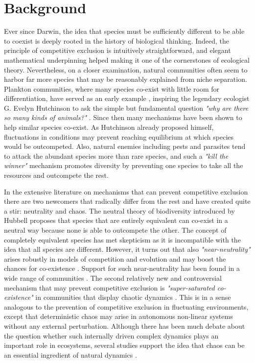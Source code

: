 \section{Background}
\label{sec:Background} 
Ever since Darwin, the idea that species must be sufficiently different to be able to coexist is deeply rooted in the history of biological thinking. Indeed, the principle of competitive exclusion is intuitively straightforward, and elegant mathematical underpinning\cite{MacArthur} helped making it one of the cornerstones of ecological theory. Nevertheless, on a closer examination, natural communities often seem to harbor far more species that may be reasonably explained from niche separation. Plankton communities, where many species co-exist with little room for differentiation, have served as an early example \cite{Hutchinson, Hutchinson1961}, inspiring the legendary ecologist G. Evelyn Hutchinson to ask the simple but fundamental question \textit{"why are there so many kinds of animals?"} \cite{Hutchinson1961}. Since then many mechanisms have been shown to help similar species co-exist. As Hutchinson already proposed himself, fluctuations in conditions may prevent reaching equilibrium at which species would be outcompeted. Also, natural enemies including pests and parasites tend to attack the abundant species more than rare species, and such a \textit{"kill the winner"}\cite{Winter2010} mechanism promotes diversity by preventing one species to take all the resources and outcompete the rest.

In the extensive literature on mechanisms that can prevent competitive exclusion there are two newcomers that radically differ from the rest and have created quite a stir: neutrality and chaos. The neutral theory of biodiversity introduced by Hubbell \cite{Hubbell2001} proposes that species that are entirely equivalent can co-exist in a neutral way because none is able to outcompete the other. The concept of completely equivalent species has met skepticism as it is incompatible with the idea that all species are different. However, it turns out that also \textit{"near-neutrality"} arises robustly in models of competition and evolution and may boost the chances for co-existence \cite{Scheffer2006, Scheffer2018, Fort2009, Fort2010}. Support for such near-neutrality has been found in a wide range of communities \cite{Scheffer2006, Vergnon2013, Scheffera, Segura2013, Vergnon2012}. The second relatively new and controversial mechanism that may prevent competitive exclusion is \textit{"super-saturated co-existence"} in communities that display chaotic dynamics \cite{Huisman1999}. This is in a sense analogous to the prevention of competitive exclusion in fluctuating environments, except that deterministic chaos may arise in autonomous non-linear systems without any external perturbation. Although there has been much debate about the question whether such internally driven complex dynamics plays an important role in ecosystems, several studies support the idea that chaos can be an essential ingredient of natural dynamics \cite{Beninca2008}.

